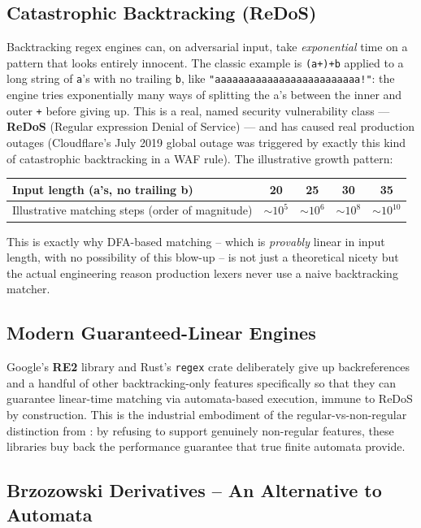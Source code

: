 \documentclass[full-course-notes.tex]{subfiles}
\begin{document}
\subsection{Catastrophic Backtracking (ReDoS)}

Backtracking regex engines can, on adversarial input, take \emph{exponential} time on a pattern
that looks entirely innocent. The classic example is \verb|(a+)+b| applied to a long string of
\texttt{a}'s with no trailing \texttt{b}, like \texttt{"aaaaaaaaaaaaaaaaaaaaaaaaa!"}: the engine
tries exponentially many ways of splitting the a's between the inner and outer \texttt{+} before
giving up. This is a real, named security vulnerability class --- \textbf{ReDoS} (Regular
expression Denial of Service) --- and has caused real production outages (Cloudflare's July 2019
global outage was triggered by exactly this kind of catastrophic backtracking in a WAF rule).
The illustrative growth pattern:
\begin{center}
\small
\begin{tabular}{@{}lcccc@{}}
\toprule
Input length (a's, no trailing b) & 20 & 25 & 30 & 35 \\
\midrule
Illustrative matching steps (order of magnitude) & $\sim 10^5$ & $\sim 10^6$ & $\sim 10^8$ & $\sim 10^{10}$ \\
\bottomrule
\end{tabular}
\end{center}
This is exactly why DFA-based matching -- which is \emph{provably} linear in input length, with
no possibility of this blow-up -- is not just a theoretical nicety but the actual engineering
reason production lexers never use a naive backtracking matcher.

\subsection{Modern Guaranteed-Linear Engines}

Google's \textbf{RE2} library and Rust's \texttt{regex} crate deliberately give up
backreferences and a handful of other backtracking-only features specifically so that they can
guarantee linear-time matching via automata-based execution, immune to ReDoS by construction.
This is the industrial embodiment of the regular-vs-non-regular distinction from
: by refusing to support genuinely non-regular features,
these libraries buy back the performance guarantee that true finite automata provide.

\subsection{Brzozowski Derivatives -- An Alternative to Automata}
\end{document}
